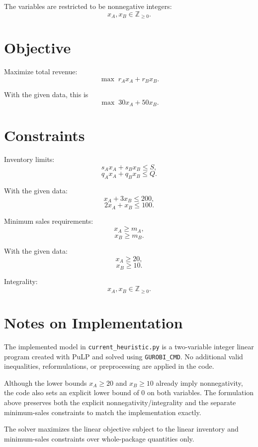 The variables are restricted to be nonnegative integers:
\[
x_A, x_B \in \mathbb{Z}_{\ge 0}.
\]

\section*{Objective}

Maximize total revenue:
\[
\max \; r_A x_A + r_B x_B.
\]

With the given data, this is
\[
\max \; 30x_A + 50x_B.
\]

\section*{Constraints}

Inventory limits:
\[
s_A x_A + s_B x_B \le S,
\]
\[
q_A x_A + q_B x_B \le Q.
\]

With the given data:
\[
x_A + 3x_B \le 200,
\]
\[
2x_A + x_B \le 100.
\]

Minimum sales requirements:
\[
x_A \ge m_A,
\]
\[
x_B \ge m_B.
\]

With the given data:
\[
x_A \ge 20,
\]
\[
x_B \ge 10.
\]

Integrality:
\[
x_A, x_B \in \mathbb{Z}_{\ge 0}.
\]

\section*{Notes on Implementation}

The implemented model in \texttt{current\_heuristic.py} is a two-variable integer linear program created with PuLP and solved using \texttt{GUROBI\_CMD}. No additional valid inequalities, reformulations, or preprocessing are applied in the code.

Although the lower bounds \(x_A \ge 20\) and \(x_B \ge 10\) already imply nonnegativity, the code also sets an explicit lower bound of \(0\) on both variables. The formulation above preserves both the explicit nonnegativity/integrality and the separate minimum-sales constraints to match the implementation exactly.

The solver maximizes the linear objective subject to the linear inventory and minimum-sales constraints over whole-package quantities only.
